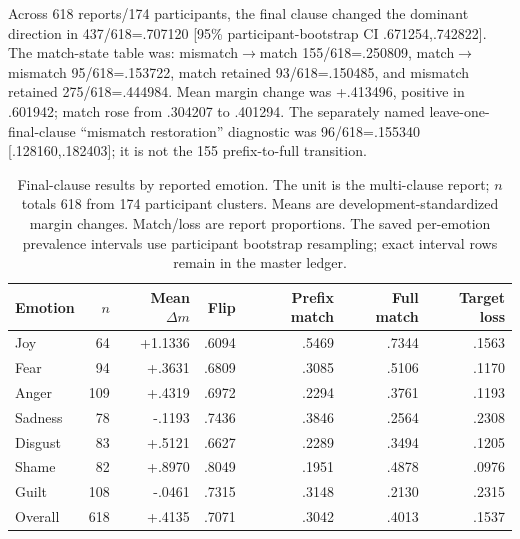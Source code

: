 Across 618 reports/174 participants, the final clause changed the dominant direction in 437/618=.707120 [95\% participant-bootstrap CI .671254,.742822]. The match-state table was: mismatch$\rightarrow$match 155/618=.250809, match$\rightarrow$mismatch 95/618=.153722, match retained 93/618=.150485, and mismatch retained 275/618=.444984. Mean margin change was +.413496, positive in .601942; match rose from .304207 to .401294. The separately named leave-one-final-clause ``mismatch restoration'' diagnostic was 96/618=.155340 [.128160,.182403]; it is not the 155 prefix-to-full transition.

\begin{table}[t]
\caption{Final-clause results by reported emotion. The unit is the multi-clause report; $n$ totals 618 from 174 participant clusters. Means are development-standardized margin changes. Match/loss are report proportions. The saved per-emotion prevalence intervals use participant bootstrap resampling; exact interval rows remain in the master ledger.}
\label{tab:app-clause-emotion}
\centering\small
\begin{tabular}{lrrrrrr}
\toprule Emotion & $n$ & Mean $\Delta m$ & Flip & Prefix match & Full match & Target loss \\
\midrule
Joy & 64 & +1.1336 & .6094 & .5469 & .7344 & .1563 \\
Fear & 94 & +.3631 & .6809 & .3085 & .5106 & .1170 \\
Anger & 109 & +.4319 & .6972 & .2294 & .3761 & .1193 \\
Sadness & 78 & -.1193 & .7436 & .3846 & .2564 & .2308 \\
Disgust & 83 & +.5121 & .6627 & .2289 & .3494 & .1205 \\
Shame & 82 & +.8970 & .8049 & .1951 & .4878 & .0976 \\
Guilt & 108 & -.0461 & .7315 & .3148 & .2130 & .2315 \\
Overall & 618 & +.4135 & .7071 & .3042 & .4013 & .1537 \\
\bottomrule\end{tabular}
\end{table}

